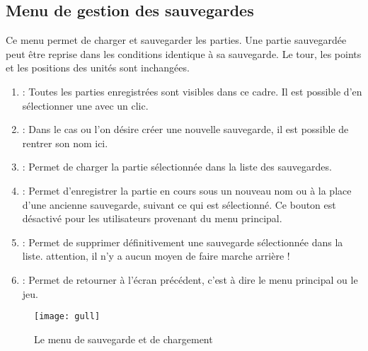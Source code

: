 	\subsection{Menu de gestion des sauvegardes}
		\label{subsec:sauvergardes}
		Ce menu permet de charger et sauvegarder les parties. Une partie sauvegardée peut être reprise dans les conditions identique à sa sauvegarde. Le tour, les points et les positions des unités sont inchangées.
		\begin{enumerate}
			\item {} : Toutes les parties enregistrées sont visibles dans ce cadre. Il est possible d'en sélectionner une avec un clic.
			\item {} : Dans le cas ou l'on désire créer une nouvelle sauvegarde, il est possible de rentrer son nom ici.
			\item {} : Permet de charger la partie sélectionnée dans la liste des sauvegardes.
			\item {} : Permet d'enregistrer la partie en cours sous un nouveau nom ou à la place d'une ancienne sauvegarde, suivant ce qui est sélectionné. 
					Ce bouton est désactivé pour les utilisateurs provenant du menu principal.
			\item {} : Permet de supprimer définitivement une sauvegarde sélectionnée dans la liste. attention, il n'y a aucun moyen de faire marche arrière !
			\item {} : Permet de retourner à l'écran précédent, c'est à dire le menu principal ou le jeu.	
		\end{enumerate}
		
		\begin{figure}[h!]
			\caption{Le menu de sauvegarde et de chargement}
			\label{fig:menuCreat}
			\centering
			\texttt{[image: gull]}
		\end{figure}
		

